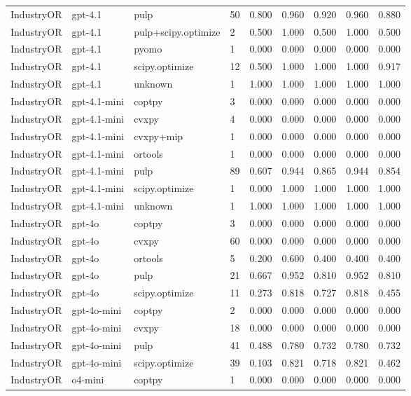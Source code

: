 \begin{table}[t]
\begin{tabular}{lllllllll}
IndustryOR & gpt-4.1 & pulp & 50 & 0.800 & 0.960 & 0.920 & 0.960 & 0.880 \\
IndustryOR & gpt-4.1 & pulp+scipy.optimize & 2 & 0.500 & 1.000 & 0.500 & 1.000 & 0.500 \\
IndustryOR & gpt-4.1 & pyomo & 1 & 0.000 & 0.000 & 0.000 & 0.000 & 0.000 \\
IndustryOR & gpt-4.1 & scipy.optimize & 12 & 0.500 & 1.000 & 1.000 & 1.000 & 0.917 \\
IndustryOR & gpt-4.1 & unknown & 1 & 1.000 & 1.000 & 1.000 & 1.000 & 1.000 \\
IndustryOR & gpt-4.1-mini & coptpy & 3 & 0.000 & 0.000 & 0.000 & 0.000 & 0.000 \\
IndustryOR & gpt-4.1-mini & cvxpy & 4 & 0.000 & 0.000 & 0.000 & 0.000 & 0.000 \\
IndustryOR & gpt-4.1-mini & cvxpy+mip & 1 & 0.000 & 0.000 & 0.000 & 0.000 & 0.000 \\
IndustryOR & gpt-4.1-mini & ortools & 1 & 0.000 & 0.000 & 0.000 & 0.000 & 0.000 \\
IndustryOR & gpt-4.1-mini & pulp & 89 & 0.607 & 0.944 & 0.865 & 0.944 & 0.854 \\
IndustryOR & gpt-4.1-mini & scipy.optimize & 1 & 0.000 & 1.000 & 1.000 & 1.000 & 1.000 \\
IndustryOR & gpt-4.1-mini & unknown & 1 & 1.000 & 1.000 & 1.000 & 1.000 & 1.000 \\
IndustryOR & gpt-4o & coptpy & 3 & 0.000 & 0.000 & 0.000 & 0.000 & 0.000 \\
IndustryOR & gpt-4o & cvxpy & 60 & 0.000 & 0.000 & 0.000 & 0.000 & 0.000 \\
IndustryOR & gpt-4o & ortools & 5 & 0.200 & 0.600 & 0.400 & 0.400 & 0.400 \\
IndustryOR & gpt-4o & pulp & 21 & 0.667 & 0.952 & 0.810 & 0.952 & 0.810 \\
IndustryOR & gpt-4o & scipy.optimize & 11 & 0.273 & 0.818 & 0.727 & 0.818 & 0.455 \\
IndustryOR & gpt-4o-mini & coptpy & 2 & 0.000 & 0.000 & 0.000 & 0.000 & 0.000 \\
IndustryOR & gpt-4o-mini & cvxpy & 18 & 0.000 & 0.000 & 0.000 & 0.000 & 0.000 \\
IndustryOR & gpt-4o-mini & pulp & 41 & 0.488 & 0.780 & 0.732 & 0.780 & 0.732 \\
IndustryOR & gpt-4o-mini & scipy.optimize & 39 & 0.103 & 0.821 & 0.718 & 0.821 & 0.462 \\
IndustryOR & o4-mini & coptpy & 1 & 0.000 & 0.000 & 0.000 & 0.000 & 0.000 \\

\end{tabular}
\end{table}
